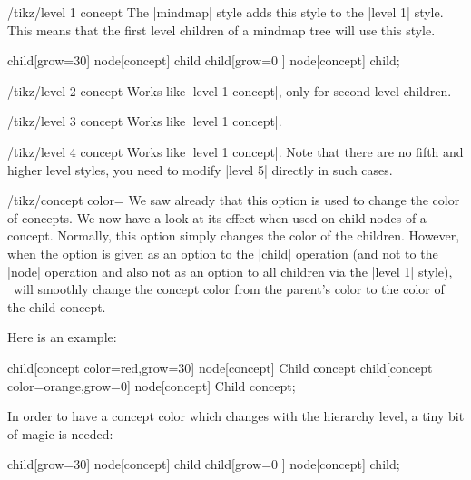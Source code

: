 \begin{stylekey}{/tikz/level 1 concept}
  The |mindmap| style adds this style to the |level 1| style. This
  means that the first level children of a mindmap tree will use this
  style.
\begin{codeexample}[]
\tikz
  [root concept/.append style={concept color=blue!80},
   level 1 concept/.append style={concept color=red!50},
   mindmap]
    child[grow=30] {node[concept] {child}}
    child[grow=0 ] {node[concept] {child}};
\end{codeexample}
\end{stylekey}
\begin{stylekey}{/tikz/level 2 concept}
  Works like |level 1 concept|, only for second level children.
\end{stylekey}
\begin{stylekey}{/tikz/level 3 concept}
  Works like |level 1 concept|.
\end{stylekey}
\begin{stylekey}{/tikz/level 4 concept}
  Works like |level 1 concept|. Note that there are no fifth and
  higher level styles, you need to modify |level 5| directly in such
  cases.
\end{stylekey}

\begin{key}{/tikz/concept color=}
  We saw already that this option is used to change the color of
  concepts. We now have a look at its effect when used on child nodes
  of a concept. Normally, this option simply changes the color of the
  children. However, when the option is given as an option to the
  |child| operation (and not to the |node| operation and also not as
  an option to all children via the |level 1| style), \tikzname\ will
  smoothly change the concept color from the parent's color to the
  color of the child concept.

  Here is an example:
\begin{codeexample}[]
\tikz[mindmap,concept color=blue!80]
    child[concept color=red,grow=30] {node[concept] {Child concept}}
    child[concept color=orange,grow=0]  {node[concept] {Child concept}};
\end{codeexample}

  In order to have a concept color which changes with the hierarchy level, a tiny bit of magic is needed:
\begin{codeexample}[]
\tikz[mindmap,text=white,
      root concept/.style={concept color=blue},
      level 1 concept/.append style=
        {every child/.style={concept color=blue!50}}]
    child[grow=30] {node[concept] {child}}
    child[grow=0 ] {node[concept] {child}};
\end{codeexample}
\end{key}

